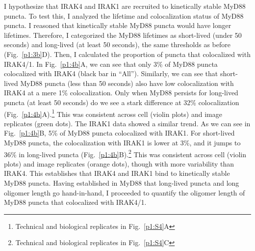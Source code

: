 I hypothesize that IRAK4 and IRAK1 are recruited to kinetically stable MyD88 puncta. To test this, I analyzed the lifetime and colocalization status of MyD88 puncta. I reasoned that kinetically stable MyD88 puncta would have longer lifetimes. Therefore, I categorized the MyD88 lifetimes as short-lived (under 50 seconds) and long-lived (at least 50 seconds), the same thresholds as before (Fig.~\ref{p1:3b}D). Then, I calculated the proportion of puncta that colocalized with IRAK4/1. In Fig.~\ref{p1:4b}A, we can see that only 3\% of MyD88 puncta colocalized with IRAK4 (black bar in “All”). Similarly, we can see that short-lived MyD88 puncta (less than 50 seconds) also have low colocalization with IRAK4 at a mere 1\% colocalization. Only when MyD88 persists for long-lived puncta (at least 50 seconds) do we see a stark difference at 32\% colocalization (Fig.~\ref{p1:4b}A).\footnote{Technical and biological replicates in Fig.~\ref{p1:S4}A} This was consistent across cell (violin plots) and image replicates (green dots). The IRAK1 data showed a similar trend. As we can see in Fig.~\ref{p1:4b}B, 5\% of MyD88 puncta colocalized with IRAK1. For short-lived MyD88 puncta, the colocalization with IRAK1 is lower at 3\%, and it jumps to 36\% in long-lived puncta (Fig.~\ref{p1:4b}B).\footnote{Technical and biological replicates in Fig.~\ref{p1:S4}C} This was consistent across cell (violin plots) and image replicates (orange dots), though with more variability than IRAK4. This establishes that IRAK4 and IRAK1 bind to kinetically stable MyD88 puncta. Having established in MyD88 that long-lived puncta and long oligomer length go hand-in-hand, I proceeded to quantify the oligomer length of MyD88 puncta that colocalized with IRAK4/1.

